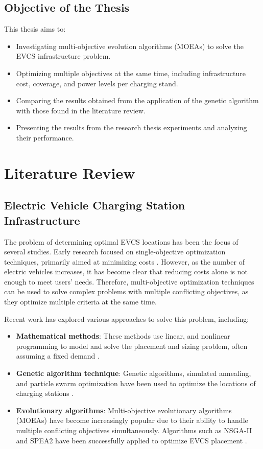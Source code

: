 \documentclass[12pt]{report}
\begin{document}
\section{Objective of the Thesis}
This thesis aims to:
\begin{itemize}
    \item Investigating multi-objective evolution algorithms (MOEAs) to solve the EVCS infrastructure problem.
    \item Optimizing multiple objectives at the same time, including infrastructure cost, coverage, and power levels per charging stand.
    \item Comparing the results obtained from the application of the genetic algorithm with those found in the literature review.
    \item Presenting the results from the research thesis experiments and analyzing their performance.
\end{itemize}


\chapter{Literature Review}

\section{Electric Vehicle Charging Station Infrastructure}
The problem of determining optimal EVCS locations has been the focus of several studies. Early research focused on single-objective optimization techniques, primarily aimed at minimizing costs \cite{ref1}. However, as the number of electric vehicles increases, it has become clear that reducing costs alone is not enough to meet users' needs. Therefore, multi-objective optimization techniques can be used to solve complex problems with multiple conflicting objectives, as they optimize multiple criteria at the same time.

Recent work has explored various approaches to solve this problem, including:
\begin{itemize}
    \item \textbf{Mathematical methods}: These methods use linear, and nonlinear programming to model and solve the placement and sizing problem, often assuming a fixed demand \cite{ref2}.
    \item \textbf{Genetic algorithm technique}: Genetic algorithms, simulated annealing, and particle swarm optimization have been used to optimize the locations of charging stations \cite{ref3}.
    \item \textbf{Evolutionary algorithms}: Multi-objective evolutionary algorithms (MOEAs) have become increasingly popular due to their ability to handle multiple conflicting objectives simultaneously. Algorithms such as NSGA-II and SPEA2 have been successfully applied to optimize EVCS placement \cite{ref4}.
\end{itemize}
\end{document}
